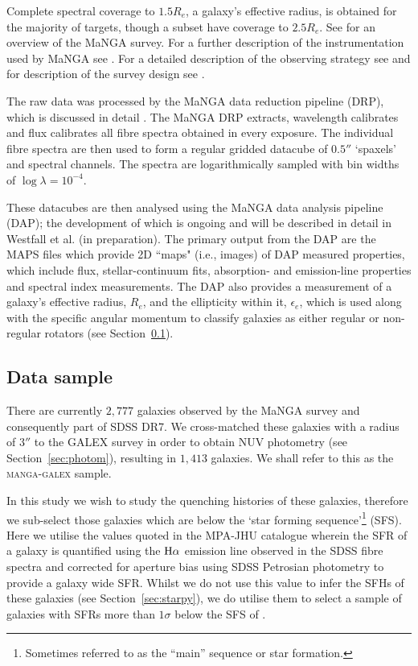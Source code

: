 \documentclass[useAMS,usenatbib]{mn2e}
\begin{document}
Complete spectral coverage to $1.5 R_e$, a galaxy's effective radius, is obtained for the majority of targets, though a subset have coverage to $2.5 R_e$. See \cite{bundy15} for an overview of the MaNGA survey. For a further description of the instrumentation used by MaNGA see \cite{drory15}. For a detailed description of the observing strategy see \cite{law15} and for  description of the survey design see \cite{yan16}. %

The raw data was processed by the MaNGA data reduction pipeline (DRP), which is discussed in detail \cite{law16}. The MaNGA DRP extracts, wavelength calibrates and flux calibrates all fibre spectra obtained in every exposure. The individual fibre spectra are then used to form a regular gridded datacube of $0.5''$ ‘spaxels’ and spectral channels. The spectra are logarithmically sampled with bin widths of $\log{\lambda} = 10^{-4}$. 

These datacubes are then analysed using the MaNGA data analysis pipeline (DAP); the development of which is ongoing and will be described in detail in Westfall et al. (in preparation). The primary output from the DAP are the MAPS files which provide 2D ``maps" (i.e., images) of DAP measured properties, which include flux, stellar-continuum fits, absorption- and emission-line properties and spectral index measurements. The DAP also provides a measurement of a galaxy's effective radius, $R_e$, and the ellipticity within it, $\epsilon_e$, which is used along with the specific angular momentum to classify galaxies as either regular or non-regular rotators (see Section~\ref{sec:mangasample}). 

\subsection{Data sample}\label{sec:mangasample}

There are currently $2,777$ galaxies observed by the MaNGA survey and consequently part of SDSS DR7. We cross-matched these galaxies with a radius of $3''$ to the GALEX survey in order to obtain NUV photometry (see Section~\ref{sec:photom}), resulting in $1,413$ galaxies. We shall refer to this as the \textsc{manga-galex} sample. 

In this study we wish to study the quenching histories of these galaxies, therefore we sub-select those galaxies which are below the `star forming sequence'\footnote{Sometimes referred to as the ``main'' sequence or star formation.} (SFS). Here we utilise the values quoted in the MPA-JHU catalogue \citep{kauffmann03, brinchmann04} wherein the SFR of a galaxy is quantified using the $\rm{H}\alpha$ emission line observed in the SDSS fibre spectra and corrected for aperture bias using SDSS Petrosian photometry to provide a galaxy wide SFR. Whilst we do not use this value to infer the SFHs of these galaxies (see Section~\ref{sec:starpy}), we do utilise them to select a sample of galaxies with SFRs more than $1\sigma$ below the SFS of \cite{peng10}. 
\end{document}
